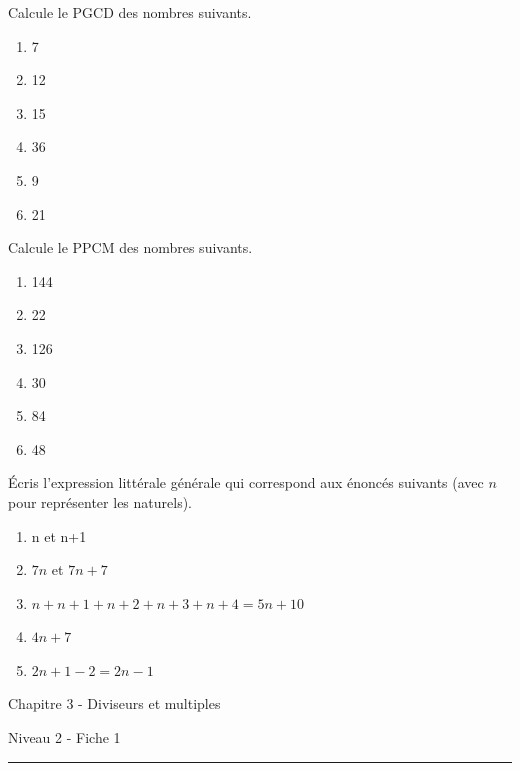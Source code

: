 \documentclass[12pt,parskip=half-, twoside=semi]{scrartcl}
\begin{document}
      \begin{exercise}
        Calcule le PGCD des nombres suivants.
          \begin{enumerate}[cols=3]
              \item 7
              \item 12
              \item 15
              \item 36
              \item 9
              \item 21
          \end{enumerate}
      \end{exercise}
      
      \begin{exercise}
        Calcule le PPCM des nombres suivants.
          \begin{enumerate}[cols=3]
              \item 144
              \item 22
              \item 126
              \item 30
              \item 84
              \item 48 
          \end{enumerate}
      \end{exercise}
      
      \begin{exercise}
          Écris l'expression littérale générale qui correspond aux énoncés suivants (avec \(n\) pour représenter les naturels).
          \begin{enumerate}[cols=2]
              \item n et n+1  
              \item $7n$ et $7n+7$
              \item $n + n+1 + n+2 + n+3 + n+4 = 5n + 10$
              \item $4n + 7$
              \item $2n +1 - 2 = 2n -1$
          \end{enumerate}
        \end{exercise}



\newpage

\begin{center}
  \bfseries
  \begin{Huge}
    Chapitre 3 - Diviseurs et multiples
  \end{Huge}
  \smallbreak
  \begin{large}
    Niveau 2  - Fiche 1
  \end{large}
  \smallbreak
  \rule[10pt]{.5\linewidth}{1 pt}
\end{center}
\end{document}
